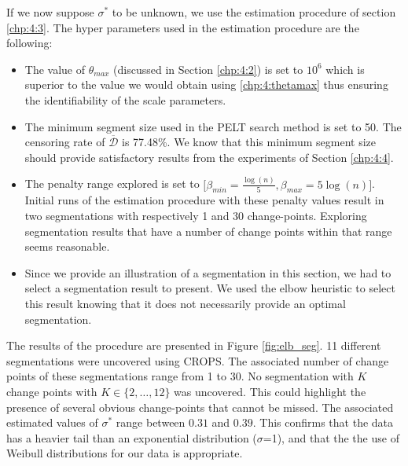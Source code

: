 If we now suppose $\sigma^*$ to be unknown, we use the estimation procedure of section \ref{chp:4:3}. The hyper parameters used in the estimation procedure are the following: 
\begin{itemize}
\item The value of $\theta_{max}$ (discussed in Section \ref{chp:4:2}) is set to $10^6$ which is superior to the value we would obtain using \eqref{chp:4:thetamax} thus ensuring the identifiability of the scale  parameters. 
\item The minimum segment size used in the PELT search method is set to 50. The censoring rate of $\overline{\mathcal{D}}$ is 77.48\%. We know that this minimum segment size should provide satisfactory results from the experiments of Section \ref{chp:4:4}.
\item The penalty range explored is set to $\bigg[\beta_{min} = \frac{\log(n)}{5},\beta_{max} = 5\log(n)\bigg]$. Initial runs of the estimation procedure with these penalty values result in two segmentations with respectively 1 and 30 change-points. Exploring segmentation results that have a number of change points within that range seems reasonable. 
\item Since we provide an illustration of a segmentation in this section, we had to select a segmentation result to present. We used the elbow heuristic to select this result knowing that it does not necessarily provide an optimal segmentation.  
\end{itemize}

The results of the procedure are presented in Figure \ref{fig:elb_seg}. 11 different segmentations were uncovered using CROPS. 
The associated number of change points of these segmentations range from 1 to 30. No segmentation with $K$ change points with $K\in\{2,\dots,12\}$ was uncovered. This could highlight the presence of several obvious change-points that cannot be missed. 
The associated estimated values of $\sigma^*$ range between $0.31$ and $0.39$. This confirms that the data has a heavier tail than an exponential distribution ($\sigma$=1), and that the the use of Weibull distributions for our data is appropriate.  

